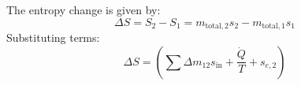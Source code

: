 The entropy change is given by:  
\[
\Delta S = S_2 - S_1 = m_{\text{total},2} s_2 - m_{\text{total},1} s_1
\]  
Substituting terms:  
\[
\Delta S = \left( \sum \Delta m_{12} s_{\text{in}} + \frac{\dot{Q}}{T} + s_{e,2} \right)
\]